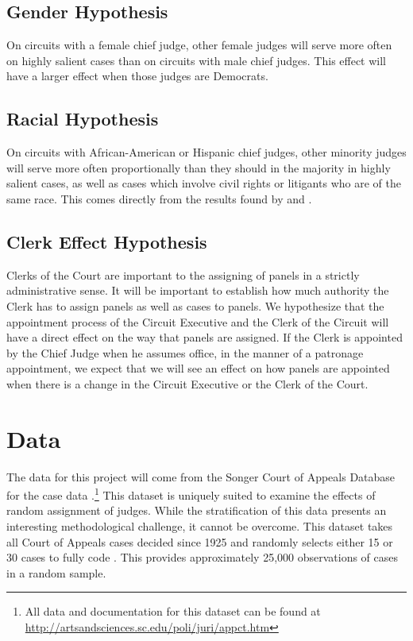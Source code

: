 \documentclass[12pt]{article}
\begin{document}
\subsection*{Gender Hypothesis}
On circuits with a female chief judge, other female judges will serve more often on highly salient cases than on circuits with male chief judges.  This effect will have a larger effect when those judges are Democrats.

\subsection*{Racial Hypothesis}
On circuits with African-American or Hispanic chief judges, other minority judges will serve more often proportionally than they should in the majority in highly salient cases, as well as cases which involve civil rights or litigants who are of the same race.  This comes directly from the results found by \citet{Atkins1974} and \citet{Brown2000}.

\subsection*{Clerk Effect Hypothesis}
Clerks of the Court are important to the assigning of panels in a strictly administrative sense.  It will be important to establish how much authority the Clerk has to assign panels as well as cases to panels.  We hypothesize that the appointment process of the Circuit Executive and the Clerk of the Circuit will have a direct effect on the way that panels are assigned.  If the Clerk is appointed by the Chief Judge when he assumes office, in the manner of a patronage appointment, we expect that we will see an effect on how panels are appointed when there is a change in the Circuit Executive or the Clerk of the Court.

\section{Data}\label{Data}
The data for this project will come from the Songer Court of Appeals Database for the case data \citep{Songer2007}.\footnote{All data and documentation for this dataset can be found at \url{http://artsandsciences.sc.edu/poli/juri/appct.htm}}  This dataset is uniquely suited to examine the effects of random assignment of judges.  While the stratification of this data presents an interesting methodological challenge, it cannot be overcome.  This dataset takes all Court of Appeals cases decided since 1925 and randomly selects either 15 or 30 cases to fully code \citep{hurwitz2006institutional,hurtwitz2012changes}.  This provides approximately 25,000 observations of cases in a random sample.   
\end{document}
